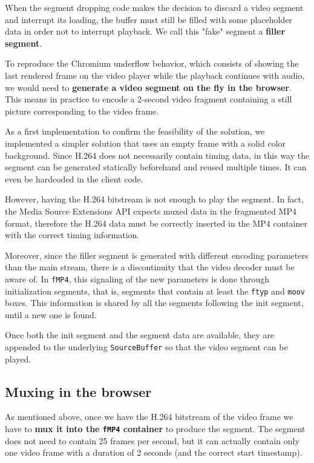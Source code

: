 When the segment dropping code makes the decision to discard a video segment and interrupt its loading, the buffer must still be filled with some placeholder data in order not to interrupt playback. We call this "fake" segment a \textbf{filler segment}.

To reproduce the Chromium underflow behavior, which consists of showing the last rendered frame on the video player while the playback continues with audio, we would need to \textbf{generate a video segment on the fly in the browser}. This means in practice to encode a 2-second video fragment containing a still picture corresponding to the video frame.

As a first implementation to confirm the feasibility of the solution, we implemented a simpler solution that uses an empty frame with a solid color background. Since H.264 does not necessarily contain timing data, in this way the segment can be generated statically beforehand and reused multiple times. It can even be hardcoded in the client code.

However, having the H.264 bitstream is not enough to play the segment. In fact, the Media Source Extensions API expects muxed data in the fragmented MP4 format, therefore the H.264 data must be correctly inserted in the MP4 container with the correct timing information.

Moreover, since the filler segment is generated with different encoding parameters than the main stream, there is a discontinuity that the video decoder must be aware of. In \texttt{fMP4}, this signaling of the new parameters is done through initialization segments, that is, segments that contain at least the \texttt{ftyp} and \texttt{moov} boxes. This information is shared by all the segments following the init segment, until a new one is found.

Once both the init segment and the segment data are available, they are appended to the underlying \texttt{SourceBuffer} so that the video segment can be played.

\subsection{Muxing in the browser}
\label{sec:improvements/impl/muxing}

As mentioned above, once we have the H.264 bitstream of the video frame we have to \textbf{mux it into the \texttt{fMP4} container} to produce the segment. The segment does not need to contain 25 frames per second, but it can actually contain only one video frame with a duration of 2 seconds (and the correct start timestamp).

